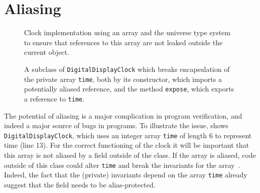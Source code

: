 \documentclass{llncs}
\begin{document}
% 
% 
% 

\section{Aliasing}
\label{Sec:ownership}

\begin{figure}[tbp]
%
%
\vspace*{-3ex} %
\caption{Clock implementation using an array and the universe type 
  system to ensure that references to this array are not leaked outside the
  current object.}
\label{Example:alias}
\end{figure}

\begin{figure}[tbp]
%
%
\vspace*{-2ex} %
\caption{A subclass of \texttt{DigitalDisplayClock} which breaks encapsulation
  of the private array \texttt{time}, both by its constructor, which imports a
  potentially aliased reference, and the method \texttt{expose}, which exports
  a reference to \texttt{time}.}
\label{Example:aliasbroken}
\end{figure}

\noindent
The potential of aliasing is a major complication in program verification,
and indeed a major source of bugs in programs. 
To illustrate the issue,  shows
\texttt{DigitalDisplayClock},
which uses an integer array \texttt{time} of length 6 
to represent time (line 13).  For the correct functioning of the clock it will be 
important that this array is not aliased by a field outside of the
class. If the array is aliased, code 
outside of this class could alter \texttt{time} and break the
invariants for the array~\cite{Noble-Vitek-Potter98}.
Indeed, the fact that the (private) invariants depend on the array 
\texttt{time} already suggest that the field needs to be alias-protected.
\end{document}
